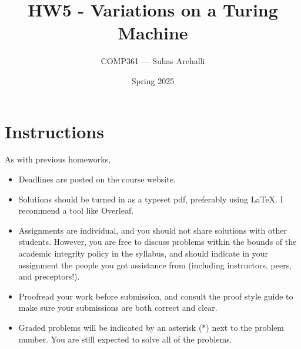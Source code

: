 \documentclass{exam}
\title{HW5 - Variations on a Turing Machine}
\author{COMP361 --- Suhas Arehalli}
\date{Spring 2025}
\theoremstyle{definition}
\begin{document}
\maketitle

\section*{Instructions}
As with previous homeworks, 

\begin{itemize}
    \item Deadlines are posted on the course website.
    \item Solutions should be turned in as a typeset pdf, preferably using LaTeX. I recommend a tool like Overleaf. 
    \item Assignments are individual, and you should not share solutions with other students. However, you are free to discuss problems within the bounds of the academic integrity policy in the syllabus, and should indicate in your assignment the people you got assistance from (including instructors, peers, and preceptors!). 
    \item Proofread your work before submission, and consult the proof style guide to make sure your submissions are both correct and clear.
    \item Graded problems will be indicated by an asterisk (*) next to the problem number. You are still expected to solve all of the problems.
\end{itemize}
\end{document}
